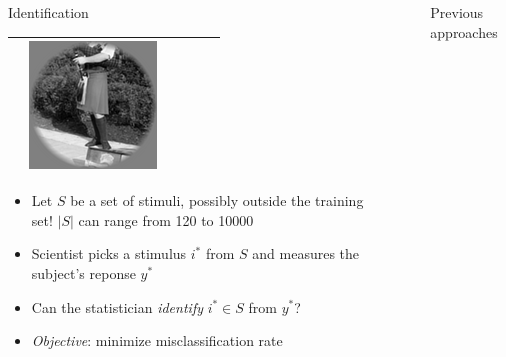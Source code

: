 \documentclass[final]{beamer}
\newlength{\sepwid}
\newlength{\onecolwid}
\begin{document}
\begin{frame}[t]
\begin{columns}[t]
\begin{column}{\onecolwid}
\begin{block}{Identification}
\begin{center}
\begin{tabular}{c|c|cccc}
& \includegraphics[scale = .7]{img8.png}\\
\hline
\end{tabular}
\end{center}
\begin{itemize}
\item Let $S$ be a set of stimuli, possibly outside the training set! $|S|$ can range from 120 to 10000
\item Scientist picks a stimulus $i^*$ from $S$ and measures the subject's reponse $y^*$
\item Can the statistician \emph{identify} $i^* \in S$ from $y^*$?
\item \emph{Objective}: minimize misclassification rate
\end{itemize}
\end{block}

\end{column} %

\begin{column}{\sepwid}\end{column} %



\begin{column}{\onecolwid}




\begin{block}{Previous approaches}


\end{block}
\end{column}
\end{columns}
\end{frame}
\end{document}
